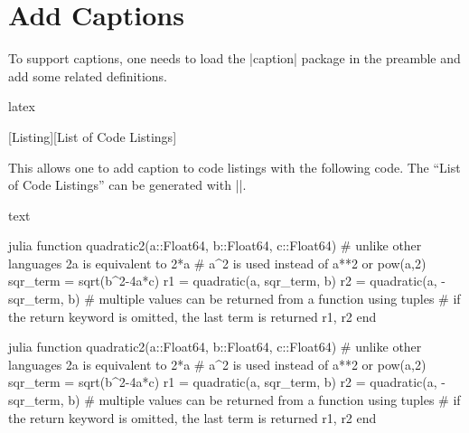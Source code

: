 \documentclass[letterpaper, 11pt, DIV=11]{scrartcl}
\newenvironment{mylisting}{\medskip\captionsetup{type=listing, labelsep=colon}}{\medskip}
\begin{document}
\section{Add Captions}

To support captions, one needs to load the \rawinline|caption| package in the preamble and add some related definitions. 

\begin{tcbsrccode}{latex}
\usepackage{caption}

\newenvironment{mylisting}{\medskip\captionsetup{type=listing, labelsep=space}}{\medskip}
[Listing][List of Code Listings]
\end{tcbsrccode}

This allows one to add caption to code listings with the following code. The ``List of Code Listings'' can be generated with \texinline|\listoflstcaps|.

\begin{tcbsrccode}{text}
\begin{mylisting}
\begin{tcbcode*}{julia}
function quadratic2(a::Float64, b::Float64, c::Float64)
    # unlike other languages 2a is equivalent to 2*a
    # a^2 is used instead of a**2 or pow(a,2)
    sqr_term = sqrt(b^2-4a*c)
    r1 = quadratic(a, sqr_term, b)
    r2 = quadratic(a, -sqr_term, b)
    # multiple values can be returned from a function using tuples
    # if the return keyword is omitted, the last term is returned
    r1, r2
end
\end{tcbcode*}
\end{mylisting}
\listoflstcaps
\end{tcbsrccode}

\begin{mylisting}
\begin{tcbcode*}{julia}
function quadratic2(a::Float64, b::Float64, c::Float64)
    # unlike other languages 2a is equivalent to 2*a
    # a^2 is used instead of a**2 or pow(a,2)
    sqr_term = sqrt(b^2-4a*c)
    r1 = quadratic(a, sqr_term, b)
    r2 = quadratic(a, -sqr_term, b)
    # multiple values can be returned from a function using tuples
    # if the return keyword is omitted, the last term is returned
    r1, r2
end
\end{tcbcode*}
\end{mylisting}
\listoflstcaps
\end{document}
